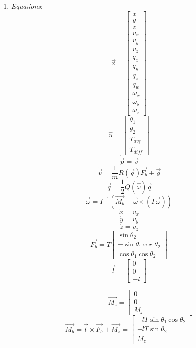 \documentclass[]{article}
\begin{document}
	\begin{enumerate}
	\item {\em Equations}:
        \[
        \dot{\vec{x}} =
        \begin{bmatrix}
        x \\ y \\ z \\ v_x \\ v_y \\ v_z \\ q_x \\ q_y \\ q_z \\ q_w \\ \omega_x \\ \omega_y \\ \omega_z
        \end{bmatrix}
        \]
        \[
        \dot{\vec{u}} =
        \begin{bmatrix}
        \theta_1 \\ \theta_2 \\ T_{avg} \\ T_{diff}
        \end{bmatrix}
        \]
	\[
		\dot{\vec{p}} = \vec{v}
	\]
	\[
		\dot{\vec{v}} = \frac{1}{m}R(\vec{q})\vec{F_b}+\vec{g}
	\]
	\[
		\dot{\vec{q}} = \frac{1}{2}Q(\vec{\omega})\vec{q}
	\]
	\[
		\dot{\vec{\omega}} = I^{-1}\!\left(\vec{M_b} - \vec{\omega} \times (I\,\vec{\omega})\right)
	\]
	\[
		\dot{x} = v_x
	\]
	\[
		\dot{y} = v_y
	\]
	\[
		\dot{z} = v_z
	\]
	 \[
         \vec{F_b} = T
        \begin{bmatrix}
        \sin{\theta_2}  \\
         -\sin{\theta_1}\cos{\theta_2}  \\
         \cos{\theta_1}\cos{\theta_2}
        \end{bmatrix}
        \]
        \[
	\vec{l} =
        \begin{bmatrix}
        0  \\
        0  \\
        -l
        \end{bmatrix}
        \]
        
        \[
	\vec{M_z} =
        \begin{bmatrix}
        0  \\
        0  \\
        M_z
        \end{bmatrix}
        \]
        	 \[
        \vec{M_b} = \vec{l} \times \vec{F_b} + \vec{M_z}=       
        \begin{bmatrix}
        -lT\sin{\theta_1}\cos{\theta_2}  \\
        -lT\sin{\theta_2}  \\
	M_z
        \end{bmatrix}
        \]
        

\end{enumerate}
\end{document}
